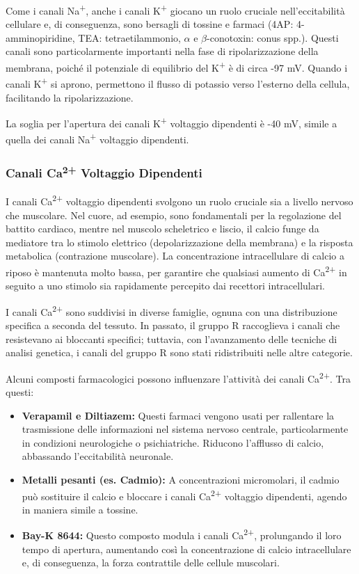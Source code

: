 Come i canali Na\textsuperscript{+}, anche i canali K\textsuperscript{+} giocano un ruolo cruciale nell'eccitabilità cellulare e, di conseguenza, sono bersagli di tossine e farmaci (4AP: 4-amminopiridine, TEA: tetraetilammonio, $\alpha$ e $\beta$-conotoxin: conus spp.). Questi canali sono particolarmente importanti nella fase di ripolarizzazione della membrana, poiché il potenziale di equilibrio del K\textsuperscript{+} è di circa -97 mV. Quando i canali K\textsuperscript{+} si aprono, permettono il flusso di potassio verso l'esterno della cellula, facilitando la ripolarizzazione.

La soglia per l'apertura dei canali K\textsuperscript{+} voltaggio dipendenti è -40 mV, simile a quella dei canali Na\textsuperscript{+} voltaggio dipendenti.

\subsubsection{Canali Ca\textsuperscript{2+} Voltaggio Dipendenti}

I canali Ca\textsuperscript{2+} voltaggio dipendenti svolgono un ruolo cruciale sia a livello nervoso che muscolare. Nel cuore, ad esempio, sono fondamentali per la regolazione del battito cardiaco, mentre nel muscolo scheletrico e liscio, il calcio funge da mediatore tra lo stimolo elettrico (depolarizzazione della membrana) e la risposta metabolica (contrazione muscolare). La concentrazione intracellulare di calcio a riposo è mantenuta molto bassa, per garantire che qualsiasi aumento di Ca\textsuperscript{2+} in seguito a uno stimolo sia rapidamente percepito dai recettori intracellulari.

I canali Ca\textsuperscript{2+} sono suddivisi in diverse famiglie, ognuna con una distribuzione specifica a seconda del tessuto. In passato, il gruppo R raccoglieva i canali che resistevano ai bloccanti specifici; tuttavia, con l'avanzamento delle tecniche di analisi genetica, i canali del gruppo R sono stati ridistribuiti nelle altre categorie.

Alcuni composti farmacologici possono influenzare l'attività dei canali Ca\textsuperscript{2+}. Tra questi:
\begin{itemize}
    \item \textbf{Verapamil e Diltiazem:} Questi farmaci vengono usati per rallentare la trasmissione delle informazioni nel sistema nervoso centrale, particolarmente in condizioni neurologiche o psichiatriche. Riducono l'afflusso di calcio, abbassando l'eccitabilità neuronale.
    \item \textbf{Metalli pesanti (es. Cadmio):} A concentrazioni micromolari, il cadmio può sostituire il calcio e bloccare i canali Ca\textsuperscript{2+} voltaggio dipendenti, agendo in maniera simile a tossine.
    \item \textbf{Bay-K 8644:} Questo composto modula i canali Ca\textsuperscript{2+}, prolungando il loro tempo di apertura, aumentando così la concentrazione di calcio intracellulare e, di conseguenza, la forza contrattile delle cellule muscolari.
\end{itemize}

